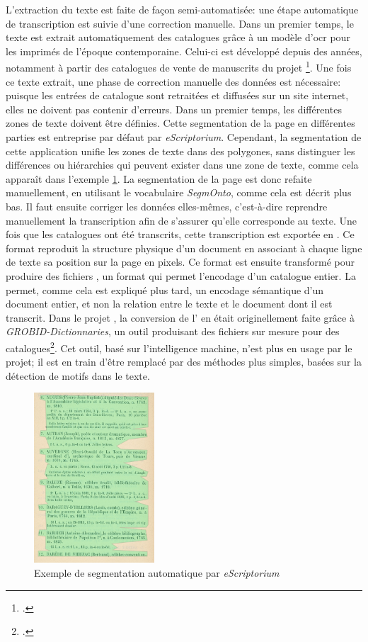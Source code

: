 L'extraction du texte est faite de façon semi-automatisée: une étape automatique de transcription est suivie d'une correction manuelle. Dans un premier temps, le texte est extrait automatiquement des catalogues grâce à un modèle d'\gls{ocr} pour les imprimés de l'époque contemporaine. Celui-ci est développé depuis des années, notamment à partir des catalogues de vente de manuscrits du projet \ktb{}\footcite[p. 34-35]{janes_du_2021}. Une fois ce texte extrait, une phase de correction manuelle des données est nécessaire: puisque les entrées de catalogue sont retraitées et diffusées sur un site internet, elles ne doivent pas contenir d'erreurs. Dans un premier temps, les différentes zones de texte doivent être définies. Cette segmentation de la page en différentes parties est entreprise par défaut par \textit{eScriptorium}. Cependant, la segmentation de cette application unifie les zones de texte dans des polygones, sans distinguer les différences ou hiérarchies qui peuvent exister dans une zone de texte, comme cela apparaît dans l'exemple \ref{fig:seg}. La segmentation de la page est donc refaite manuellement, en utilisant le vocabulaire \textit{SegmOnto}, comme cela est décrit plus bas. Il faut ensuite corriger les données elles-mêmes, c'est-à-dire reprendre manuellement la transcription afin de s'assurer qu'elle corresponde au texte. Une fois que les catalogues ont été transcrits, cette transcription est exportée en \alto{}. Ce format \xml{} reproduit la structure physique d'un document en associant à chaque ligne de texte sa position sur la page en pixels. Ce format est ensuite transformé pour produire des fichiers \xmltei{}, un format qui permet l'encodage d'un catalogue entier. La \tei{} permet, comme cela est expliqué plus tard, un encodage sémantique d'un document entier, et non la relation entre le texte et le document dont il est transcrit. Dans le projet \mssktb{}, la conversion de l'\alto{} en \tei{} était originellement faite grâce à \textit{GROBID-Dictionnaries}, un outil produisant des fichiers \tei{} sur mesure pour des catalogues\footcite{khemakhem_automatically_2018}. Cet outil, basé sur l'intelligence machine, n'est plus en usage par le projet; il est en train d'être remplacé par des méthodes plus simples, basées sur la détection de motifs dans le texte.

\begin{figure}[h]
	\centering
	\includegraphics[width=0.4\textwidth]{img/cat_000445_p2}
	\caption{Exemple de segmentation automatique par \textit{eScriptorium}}
	\label{fig:seg}
\end{figure}


